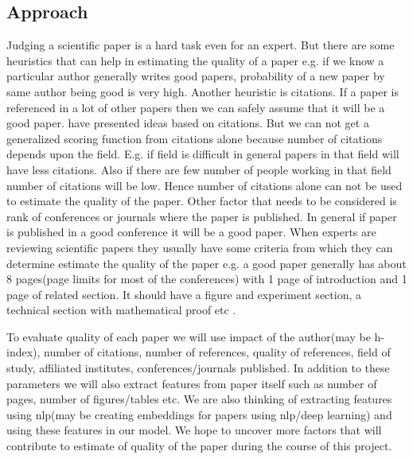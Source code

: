 \documentclass[a4paper, 11pt]{article}
\begin{document}
\subsection{Approach}
Judging a scientific paper is a hard task even for an expert. But there are some heuristics that can help in estimating the quality of a paper e.g. if we know a particular author generally writes good papers, probability of a new paper by same author being good is very high. Another heuristic is citations. If a paper is referenced in a lot of other papers then we can safely assume that it will be a good paper. \cite{Hirsch} \cite{pinksi} have presented ideas based on citations. But we can not get a generalized scoring function from citations alone because number of citations depends upon the field. E.g. if field is difficult in general papers in that field will have less citations. Also if there are few number of people working in that field number of citations will be low. Hence number of citations alone can not be used to estimate the quality of the paper. Other factor that needs to be considered is rank of conferences or journals where the paper is published. In general if paper is published in a good conference it will be a good paper.  When experts are reviewing scientific papers they usually have some criteria from which they can determine estimate the quality of the paper e.g. a good paper generally has about 8 pages(page limits for most of the conferences) with 1 page of introduction and 1 page of related section. It should have a figure and experiment section, a technical section with mathematical proof etc \cite{karpathy}.  
\par
To evaluate quality of each paper we will use impact of the author(may be h-index), number of citations, number of references, quality of references, field of study, affiliated institutes, conferences/journals published. In addition to these parameters we will also extract features from paper itself such as number of pages, number of figures/tables etc. We are also thinking of extracting features using nlp(may be creating embeddings for papers using nlp/deep learning) and using these features in our model. We hope to uncover more factors that will contribute to estimate of quality of the paper during the course of this project.
\end{document}
